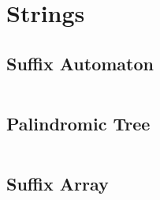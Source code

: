 \section{Strings}

\subsection{Suffix Automaton}

\inputminted{cpp}{\code/minimalist_tomato_struct.cpp}

\subsection{Palindromic Tree}

\inputminted{cpp}{\code/palindromic_tree.cpp}

\subsection{Suffix Array}

\inputminted{cpp}{\code/suffix_array_sort.cpp}
